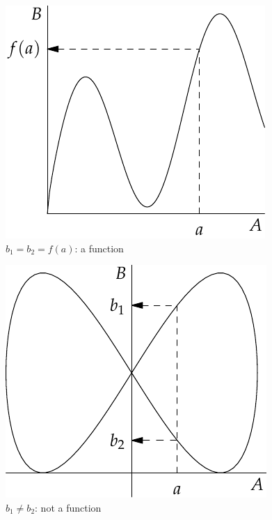 \begin{center}
	\begin{minipage}{0.32\textwidth}\centering
		\includegraphics[width=\textwidth]{relations-05-funcvert}\\
		$b_1=b_2=f(a)$: a function
	\end{minipage}\qquad\qquad\qquad\qquad
	\begin{minipage}{0.32\textwidth}\centering
		\includegraphics[width=\textwidth]{relations-06-funcvert}\\
		$b_1\neq b_2$: not a function
	\end{minipage}
\end{center}

